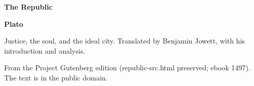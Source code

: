 \documentclass[11pt,letterpaper]{article}
\begin{document}
\color{ink}

\begin{titlepage}
\centering
\vspace*{4em}
{\LARGE\bfseries\color{heading} The Republic\par}
\vspace{2em}
{\Large\bfseries\color{heading} Plato\par}
\vspace{2.5em}
{\itshape\color{subhead}\parbox{0.8\linewidth}{\centering Justice, the soul, and the ideal city. Translated by Benjamin Jowett, with his introduction and analysis.\par}}
\vfill
{\small From the Project Gutenberg edition (republic-src.html preserved; ebook 1497). The text is in the public domain.\par}
\vspace{2em}
\end{titlepage}

\tableofcontents


\end{document}
